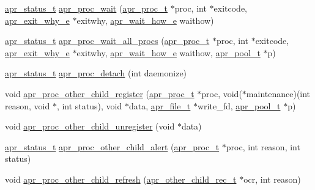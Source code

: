 \begin{DoxyCompactItemize}
\item 
\hyperlink{group__apr__errno_gaf76ee4543247e9fb3f3546203e590a6c}{apr\-\_\-status\-\_\-t} \hyperlink{group__apr__thread__proc_ga0936f7a7fe7e2d5e08979c9f343a5a1b}{apr\-\_\-proc\-\_\-wait} (\hyperlink{structapr__proc__t}{apr\-\_\-proc\-\_\-t} $\ast$proc, int $\ast$exitcode, \hyperlink{group__apr__thread__proc_gac097b4fa41e67024711c5983446d0951}{apr\-\_\-exit\-\_\-why\-\_\-e} $\ast$exitwhy, \hyperlink{group__apr__thread__proc_ga5e52d786644f3b66d6180571e68c7260}{apr\-\_\-wait\-\_\-how\-\_\-e} waithow)
\item 
\hyperlink{group__apr__errno_gaf76ee4543247e9fb3f3546203e590a6c}{apr\-\_\-status\-\_\-t} \hyperlink{group__apr__thread__proc_ga506183074e8413c3ff597539e4768ea4}{apr\-\_\-proc\-\_\-wait\-\_\-all\-\_\-procs} (\hyperlink{structapr__proc__t}{apr\-\_\-proc\-\_\-t} $\ast$proc, int $\ast$exitcode, \hyperlink{group__apr__thread__proc_gac097b4fa41e67024711c5983446d0951}{apr\-\_\-exit\-\_\-why\-\_\-e} $\ast$exitwhy, \hyperlink{group__apr__thread__proc_ga5e52d786644f3b66d6180571e68c7260}{apr\-\_\-wait\-\_\-how\-\_\-e} waithow, \hyperlink{group__apr__pools_gaf137f28edcf9a086cd6bc36c20d7cdfb}{apr\-\_\-pool\-\_\-t} $\ast$p)
\item 
\hyperlink{group__apr__errno_gaf76ee4543247e9fb3f3546203e590a6c}{apr\-\_\-status\-\_\-t} \hyperlink{group__apr__thread__proc_ga56c2b005792752b63d804f2021596406}{apr\-\_\-proc\-\_\-detach} (int daemonize)
\item 
void \hyperlink{group__apr__thread__proc_gaf8d2be452a819161aa4cd6205a17761e}{apr\-\_\-proc\-\_\-other\-\_\-child\-\_\-register} (\hyperlink{structapr__proc__t}{apr\-\_\-proc\-\_\-t} $\ast$proc, void($\ast$maintenance)(int reason, void $\ast$, int status), void $\ast$data, \hyperlink{group__apr__file__io_gaa46e4763ac375ea3c7a43ba6f6099e22}{apr\-\_\-file\-\_\-t} $\ast$write\-\_\-fd, \hyperlink{group__apr__pools_gaf137f28edcf9a086cd6bc36c20d7cdfb}{apr\-\_\-pool\-\_\-t} $\ast$p)
\item 
void \hyperlink{group__apr__thread__proc_ga10b1a4b224566c03c97f100ac8a2c830}{apr\-\_\-proc\-\_\-other\-\_\-child\-\_\-unregister} (void $\ast$data)
\item 
\hyperlink{group__apr__errno_gaf76ee4543247e9fb3f3546203e590a6c}{apr\-\_\-status\-\_\-t} \hyperlink{group__apr__thread__proc_ga88701979c4e5ac4b94966c73e0159efd}{apr\-\_\-proc\-\_\-other\-\_\-child\-\_\-alert} (\hyperlink{structapr__proc__t}{apr\-\_\-proc\-\_\-t} $\ast$proc, int reason, int status)
\item 
void \hyperlink{group__apr__thread__proc_ga74a905d90a3476a611adeeb304931a6c}{apr\-\_\-proc\-\_\-other\-\_\-child\-\_\-refresh} (\hyperlink{group__apr__thread__proc_gafc52ee8b19a7b222278d31ebb3f11a71}{apr\-\_\-other\-\_\-child\-\_\-rec\-\_\-t} $\ast$ocr, int reason)

\end{DoxyCompactItemize}
